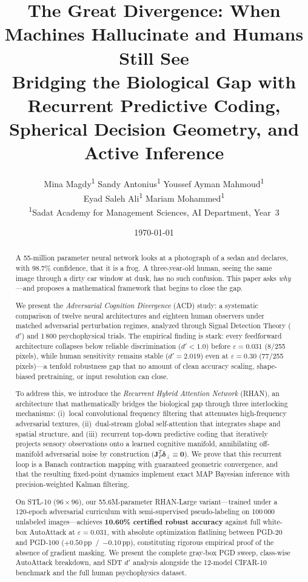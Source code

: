\documentclass[12pt,a4paper]{article}
\title{\textbf{The Great Divergence: When Machines Hallucinate and Humans Still See}\\[6pt]
\large Bridging the Biological Gap with Recurrent Predictive Coding,\\
Spherical Decision Geometry, and Active Inference}
\author{
    Mina Magdy\textsuperscript{1} \quad
    Sandy Antonius\textsuperscript{1} \quad
    Youssef Ayman Mahmoud\textsuperscript{1} \\[4pt]
    Eyad Saleh Ali\textsuperscript{1} \quad
    Mariam Mohammed\textsuperscript{1} \\[8pt]
    \small\textsuperscript{1}Sadat Academy for Management Sciences,
    AI Department, Year~3
}
\date{\small\today}
\begin{document}
\maketitle
\thispagestyle{empty}

\begin{abstract}

A 55-million parameter neural network looks at a photograph of a sedan and
declares, with 98.7\% confidence, that it is a frog. A three-year-old human,
seeing the same image through a dirty car window at dusk, has no such
confusion. This paper asks \textit{why}---and proposes a mathematical
framework that begins to close the gap.

We present the \textit{Adversarial Cognition Divergence} (ACD) study: a
systematic comparison of twelve neural architectures and eighteen human
observers under matched adversarial perturbation regimes, analyzed through
Signal Detection Theory ($d'$) and 1\,800 psychophysical trials. The
empirical finding is stark: every feedforward architecture collapses below
reliable discrimination ($d' < 1.0$) before $\varepsilon = 0.031$
(8/255 pixels), while human sensitivity remains stable
($d' = 2.019$) even at $\varepsilon = 0.30$ (77/255 pixels)---a tenfold
robustness gap that no amount of clean accuracy scaling, shape-biased
pretraining, or input resolution can close.

To address this, we introduce the \textit{Recurrent Hybrid Attention Network}
(RHAN), an architecture that mathematically bridges the biological gap
through three interlocking mechanisms: (i)~local convolutional frequency
filtering that attenuates high-frequency adversarial textures, (ii)~dual-stream
global self-attention that integrates shape and spatial structure, and
(iii)~recurrent top-down predictive coding that iteratively projects sensory
observations onto a learned cognitive manifold, annihilating off-manifold
adversarial noise by construction ($\mathbf{J}_P^T \bm{\delta}_\perp
\equiv \mathbf{0}$). We prove that this recurrent loop is a Banach
contraction mapping with guaranteed geometric convergence, and that the
resulting fixed-point dynamics implement exact MAP Bayesian inference with
precision-weighted Kalman filtering.

On STL-10 ($96{\times}96$), our 55.6M-parameter RHAN-Large variant---trained
under a 120-epoch adversarial curriculum with semi-supervised pseudo-labeling
on 100\,000 unlabeled images---achieves \textbf{10.60\% certified robust
accuracy} against full white-box AutoAttack at $\varepsilon = 0.031$, with
absolute optimization flatlining between PGD-20 and PGD-100
($+0.50$\,pp~/~$-0.10$\,pp), constituting rigorous empirical proof of the
absence of gradient masking. We present the complete gray-box PGD sweep,
class-wise AutoAttack breakdown, and SDT $d'$ analysis alongside the
12-model CIFAR-10 benchmark and the full human psychophysics dataset.


\end{abstract}
\end{document}

